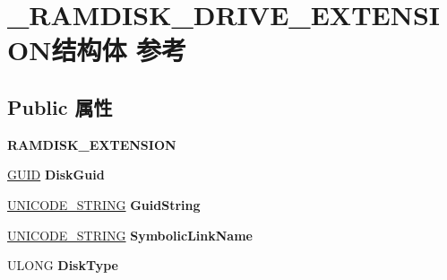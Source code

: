 \hypertarget{struct___r_a_m_d_i_s_k___d_r_i_v_e___e_x_t_e_n_s_i_o_n}{}\section{\+\_\+\+R\+A\+M\+D\+I\+S\+K\+\_\+\+D\+R\+I\+V\+E\+\_\+\+E\+X\+T\+E\+N\+S\+I\+O\+N结构体 参考}
\label{struct___r_a_m_d_i_s_k___d_r_i_v_e___e_x_t_e_n_s_i_o_n}
\subsection*{Public 属性}
\begin{DoxyCompactItemize}
\item 
\mbox{\label{struct___r_a_m_d_i_s_k___d_r_i_v_e___e_x_t_e_n_s_i_o_n_aa94e3b4304b305fb76ff5207c5ddf2b4}} 
{\bfseries R\+A\+M\+D\+I\+S\+K\+\_\+\+E\+X\+T\+E\+N\+S\+I\+ON}
\item 
\mbox{\label{struct___r_a_m_d_i_s_k___d_r_i_v_e___e_x_t_e_n_s_i_o_n_a33ce0a76a664e0da268fa2e97b862fab}} 
\hyperlink{interface_g_u_i_d}{G\+U\+ID} {\bfseries Disk\+Guid}
\item 
\mbox{\label{struct___r_a_m_d_i_s_k___d_r_i_v_e___e_x_t_e_n_s_i_o_n_a9a61a7c192a5bad786274cd3c8de2e8b}} 
\hyperlink{struct___u_n_i_c_o_d_e___s_t_r_i_n_g}{U\+N\+I\+C\+O\+D\+E\+\_\+\+S\+T\+R\+I\+NG} {\bfseries Guid\+String}
\item 
\mbox{\label{struct___r_a_m_d_i_s_k___d_r_i_v_e___e_x_t_e_n_s_i_o_n_a6f2a30f9f0ea0a18f1da3c24d787fab4}} 
\hyperlink{struct___u_n_i_c_o_d_e___s_t_r_i_n_g}{U\+N\+I\+C\+O\+D\+E\+\_\+\+S\+T\+R\+I\+NG} {\bfseries Symbolic\+Link\+Name}
\item 
\mbox{\label{struct___r_a_m_d_i_s_k___d_r_i_v_e___e_x_t_e_n_s_i_o_n_a89efaa8cc99402567013327139eb9bf7}} 
U\+L\+O\+NG {\bfseries Disk\+Type}
\item 
\mbox{\label{struct___r_a_m_d_i_s_k___d_r_i_v_e___e_x_t_e_n_s_i_o_n_a4e878b07169892ce362f4dc3702b7b40}} 

\end{DoxyCompactItemize}
